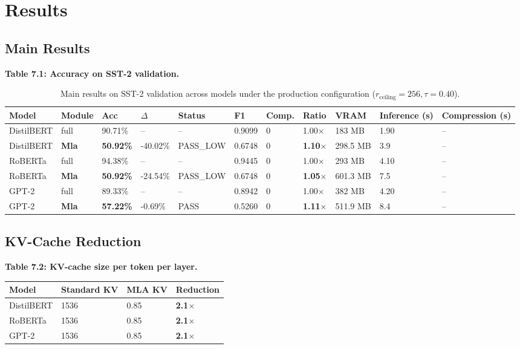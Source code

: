
\section{Results}

\subsection{Main Results}

\textbf{Table 7.1: Accuracy on SST-2 validation.}

\begin{table}[t]
\centering
\small
\begin{tabular}{lllllllllll}
\toprule
\textbf{Model} & \textbf{Module} & \textbf{Acc} & \textbf{$\Delta$} & \textbf{Status} & \textbf{F1} & \textbf{Comp.} & \textbf{Ratio} & \textbf{VRAM} & \textbf{Inference (s)} & \textbf{Compression (s)} \\
\midrule
DistilBERT & full & 90.71\% & -- & -- & 0.9099 & 0 & 1.00$\times$ & 183 MB & 1.90 & -- \\
DistilBERT & \textbf{Mla} & \textbf{50.92\%} & -40.02\% & PASS_LOW & 0.6748 & 0 & \textbf{1.10$\times$} & 298.5 MB & 3.9 & -- \\
RoBERTa & full & 94.38\% & -- & -- & 0.9445 & 0 & 1.00$\times$ & 293 MB & 4.10 & -- \\
RoBERTa & \textbf{Mla} & \textbf{50.92\%} & -24.54\% & PASS_LOW & 0.6748 & 0 & \textbf{1.05$\times$} & 601.3 MB & 7.5 & -- \\
GPT-2 & full & 89.33\% & -- & -- & 0.8942 & 0 & 1.00$\times$ & 382 MB & 4.20 & -- \\
GPT-2 & \textbf{Mla} & \textbf{57.22\%} & -0.69\% & PASS & 0.5260 & 0 & \textbf{1.11$\times$} & 511.9 MB & 8.4 & -- \\
\bottomrule
\end{tabular}
\caption{Main results on SST-2 validation across models under the production configuration ($r_{\mathrm{ceiling}}=256, \tau=0.40$).}
\label{tab:main_sst2}
\end{table}

\subsection{KV-Cache Reduction}

\textbf{Table 7.2: KV-cache size per token per layer.}

\begin{table}[H]
\centering
\small
\begin{tabular}{llll}
\toprule
\textbf{Model} & \textbf{Standard KV} & \textbf{MLA KV} & \textbf{Reduction} \\
\midrule
DistilBERT & 1536 & 0.85 & \textbf{2.1$\times$} \\
RoBERTa & 1536 & 0.85 & \textbf{2.1$\times$} \\
GPT-2 & 1536 & 0.85 & \textbf{2.1$\times$} \\
\bottomrule
\end{tabular}
\end{table}

